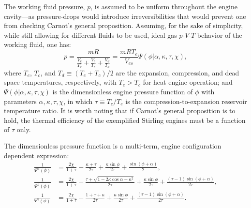    The working fluid pressure, $p$, is assumed to be uniform throughout the engine  cavity---as
    pressure-drops would introduce  irreversibilities  that  would  prevent  one  from  checking
    Carnot's general proposition. Assuming, for the sake of simplicity, while still allowing for
    different fluids to be used, ideal gas $p$-$V$-$T$ behavior of the working fluid, one has:
    \begin{equation}
        \label{eq:P}
        p = \frac{mR}{\frac{V_e}{T_e} + \frac{V_c}{T_c} + \frac{V_d}{T_d}} = \frac{mRT_e}{V_{es}}\Psi(\phi | \alpha, \kappa, \tau, \chi),
    \end{equation}
    \noindent where $T_e$, $T_c$, and $T_d \equiv (T_e + T_c)/2$ are the expansion, compression,
    and dead space temperatures, respectively, with $T_e > T_c$ for heat engine  operation;  and
    $\Psi(\phi | \alpha, \kappa, \tau, \chi)$ is the dimensionless engine pressure  function  of
    $\phi$ with parameters $\alpha, \kappa, \tau, \chi$, in which $\tau \equiv T_c / T_e$ is the
    compression-to-expansion reservoir temperature ratio. It is worth noting  that  if  Carnot's
    general proposition is to hold, the thermal efficiency of the exemplified  Stirling  engines
    must be a function of $\tau$ only.

    The  dimensionless  pressure  function  is  a  multi-term,  engine   configuration dependent
    expression:
    \begin{align}
        \label{eq:Psia}
        \frac{1}{\Psi^{\alpha}(\phi)} &=
                \frac{2\chi}{1 + \tau} +
                \frac{\kappa + \tau}{2\tau} +
                \frac{\kappa\sin\phi}{2\tau} +
                \frac{\sin(\phi + \alpha)}{2},\\
        \label{eq:Psib}
        \frac{1}{\Psi^{\beta}(\phi)}  &=
                \frac{2\chi}{1 + \tau} +
                \frac{\tau + \sqrt{1 - 2\kappa\cos\alpha + \kappa^2}}{2\tau} +
                \frac{\kappa\sin\phi}{2\tau} +
                \frac{(\tau - 1)\sin(\phi + \alpha)}{2\tau},\\
        \label{eq:Psig}
        \frac{1}{\Psi^{\gamma}(\phi)} &=
                \frac{2\chi}{1 + \tau} +
                \frac{1 + \tau + \kappa}{2\tau} +
                \frac{\kappa\sin\phi}{2\tau} +
                \frac{(\tau - 1)\sin(\phi + \alpha)}{2\tau}.
    \end{align}

